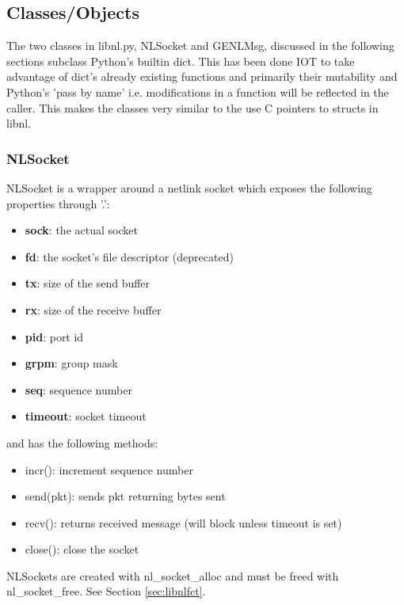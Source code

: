 \documentclass[11pt]{article}
\begin{document}
\begin{appendices}
\subsection{Classes/Objects}
The two classes in libnl.py, NLSocket and GENLMsg, discussed in the following 
sections subclass Python's builtin dict. This has been done IOT to take advantage 
of dict's already existing functions and primarily their mutability and Python's
'pass by name' i.e. modifications in a function will be reflected in the caller.
This makes the classes very similar to the use C pointers to structs in libnl.

\subsubsection{NLSocket}
NLSocket is a wrapper around a netlink socket which exposes the following 
properties through '.':
\begin{itemize}
\item \textbf{sock}: the actual socket
\item \textbf{fd}: the socket's file descriptor (deprecated)
\item \textbf{tx}: size of the send buffer
\item \textbf{rx}: size of the receive buffer
\item \textbf{pid}: port id
\item \textbf{grpm}: group mask 
\item \textbf{seq}: sequence number
\item \textbf{timeout}: socket timeout
\end{itemize}
and has the following methods:
\begin{itemize}
\item incr(): increment sequence number
\item send(pkt): sends pkt returning bytes sent
\item recv(): returns received message (will block unless timeout is set)
\item close(): close the socket
\end{itemize}

NLSockets are created with nl\_socket\_alloc and must be freed with nl\_socket\_free.
See Section \ref{sec:libnlfct}.


\end{appendices}
\end{document}

